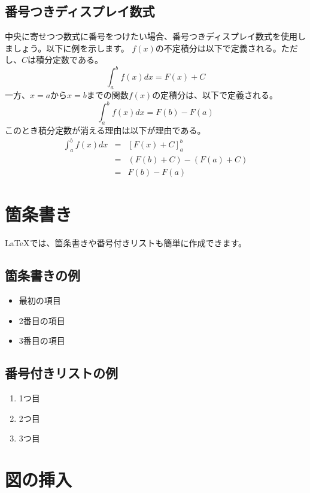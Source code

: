 \documentclass[a4paper,12pt]{article}
\begin{document}
\subsection{番号つきディスプレイ数式}
中央に寄せつつ数式に番号をつけたい場合、番号つきディスプレイ数式を使用しましょう。以下に例を示します。
$f(x)$の不定積分は以下で定義される。ただし、$C$は積分定数である。
\begin{equation}
    \int^{b}_{a} f(x) dx = F(x) + C
\end{equation}
一方、$x = a$から$x=b$までの関数$f(x)$の定積分は、以下で定義される。
\begin{equation}
    \int_a^b f(x) dx = F(b) - F(a)
\end{equation}
このとき積分定数が消える理由は以下が理由である。
\begin{eqnarray}
    \int_a^b f(x) dx &=& \left[F(x) + C\right]_a^b  \\
    &=& \left(F(b) + C\right) - \left(F(a) + C\right) \\
    &=& F(b) - F(a)
\end{eqnarray}


\section{箇条書き}

LaTeXでは、箇条書きや番号付きリストも簡単に作成できます。

\subsection{箇条書きの例}
\begin{itemize}
    \item 最初の項目
    \item 2番目の項目
    \item 3番目の項目
\end{itemize}

\subsection{番号付きリストの例}
\begin{enumerate}
    \item 1つ目
    \item 2つ目
    \item 3つ目
\end{enumerate}

\section{図の挿入}
\end{document}
